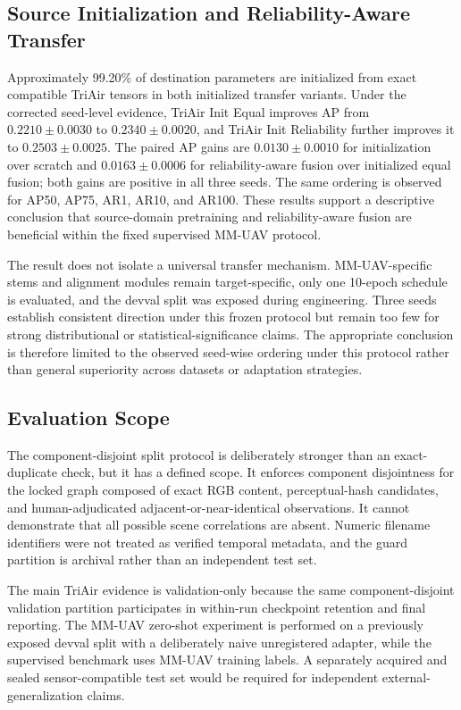 \subsection{Source Initialization and Reliability-Aware Transfer}
Approximately 99.20\% of destination parameters are initialized from exact compatible TriAir tensors in both initialized transfer variants. Under the corrected seed-level evidence, TriAir Init Equal improves AP from $0.2210\pm0.0030$ to $0.2340\pm0.0020$, and TriAir Init Reliability further improves it to $0.2503\pm0.0025$. The paired AP gains are $0.0130\pm0.0010$ for initialization over scratch and $0.0163\pm0.0006$ for reliability-aware fusion over initialized equal fusion; both gains are positive in all three seeds. The same ordering is observed for AP50, AP75, AR1, AR10, and AR100. These results support a descriptive conclusion that source-domain pretraining and reliability-aware fusion are beneficial within the fixed supervised MM-UAV protocol.

The result does not isolate a universal transfer mechanism. MM-UAV-specific stems and alignment modules remain target-specific, only one 10-epoch schedule is evaluated, and the devval split was exposed during engineering. Three seeds establish consistent direction under this frozen protocol but remain too few for strong distributional or statistical-significance claims. The appropriate conclusion is therefore limited to the observed seed-wise ordering under this protocol rather than general superiority across datasets or adaptation strategies.

\subsection{Evaluation Scope}
The component-disjoint split protocol is deliberately stronger than an exact-duplicate check, but it has a defined scope. It enforces component disjointness for the locked graph composed of exact RGB content, perceptual-hash candidates, and human-adjudicated adjacent-or-near-identical observations. It cannot demonstrate that all possible scene correlations are absent. Numeric filename identifiers were not treated as verified temporal metadata, and the guard partition is archival rather than an independent test set.

The main TriAir evidence is validation-only because the same component-disjoint validation partition participates in within-run checkpoint retention and final reporting. The MM-UAV zero-shot experiment is performed on a previously exposed devval split with a deliberately naive unregistered adapter, while the supervised benchmark uses MM-UAV training labels. A separately acquired and sealed sensor-compatible test set would be required for independent external-generalization claims.

